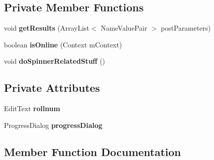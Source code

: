 \subsection*{Private Member Functions}
\begin{DoxyCompactItemize}
\item 
\hypertarget{classcom_1_1faiz_1_1ayush_1_1_j_s_o_n_use_activity_a5a78f0d4d6c3d81626d5f1917c0a9eb4}{}void {\bfseries get\+Results} (Array\+List$<$ Name\+Value\+Pair $>$ post\+Parameters)\label{classcom_1_1faiz_1_1ayush_1_1_j_s_o_n_use_activity_a5a78f0d4d6c3d81626d5f1917c0a9eb4}

\item 
\hypertarget{classcom_1_1faiz_1_1ayush_1_1_j_s_o_n_use_activity_a9d9c8faefdd3074e5f87bcf2c69c76d2}{}boolean {\bfseries is\+Online} (Context m\+Context)\label{classcom_1_1faiz_1_1ayush_1_1_j_s_o_n_use_activity_a9d9c8faefdd3074e5f87bcf2c69c76d2}

\item 
\hypertarget{classcom_1_1faiz_1_1ayush_1_1_j_s_o_n_use_activity_a441f8e1ec28f615fad03605c3972f285}{}void {\bfseries do\+Spinner\+Related\+Stuff} ()\label{classcom_1_1faiz_1_1ayush_1_1_j_s_o_n_use_activity_a441f8e1ec28f615fad03605c3972f285}

\end{DoxyCompactItemize}
\subsection*{Private Attributes}
\begin{DoxyCompactItemize}
\item 
\hypertarget{classcom_1_1faiz_1_1ayush_1_1_j_s_o_n_use_activity_aa3fc6591bdcb52221849d7b171c4f919}{}Edit\+Text {\bfseries rollnum}\label{classcom_1_1faiz_1_1ayush_1_1_j_s_o_n_use_activity_aa3fc6591bdcb52221849d7b171c4f919}

\item 
\hypertarget{classcom_1_1faiz_1_1ayush_1_1_j_s_o_n_use_activity_a3a7fc3d1822c2f6e55916f1f7fd5ef43}{}Progress\+Dialog {\bfseries progress\+Dialog}\label{classcom_1_1faiz_1_1ayush_1_1_j_s_o_n_use_activity_a3a7fc3d1822c2f6e55916f1f7fd5ef43}

\end{DoxyCompactItemize}


\subsection{Member Function Documentation}
\hypertarget{classcom_1_1faiz_1_1ayush_1_1_j_s_o_n_use_activity_a3b33ba1c6ec0a7f465f001071f60bc67}{}
